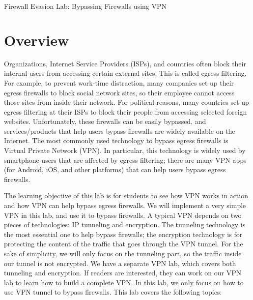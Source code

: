 



\newcommand{\firewallFigs}{./Figs}





\begin{center}
{\LARGE Firewall Evasion Lab: Bypassing Firewalls using VPN}
\end{center}



\setcounter{task}{1}
\newcommand{\tasks} {\bf {\noindent (\arabic{task})} \addtocounter{task}{1} \,}


\section{Overview}


Organizations, Internet Service Providers (ISPs), and countries often block
their internal users from accessing certain external sites. This is called
egress filtering. 
For example, to prevent work-time distraction, many companies set up their egress firewalls
to block social network sites, so their employee cannot access those sites
from inside their network. For political reasons, many countries set up egress filtering at their
ISPs to block their people from accessing
selected foreign websites. Unfortunately, these firewalls can be easily
bypassed, and services/products that help users bypass firewalls are widely
available on the Internet. The most commonly used technology to bypass
egress firewalls is Virtual Private Network (VPN).
In particular, this technology is widely used by smartphone users that are affected by
egress filtering; there are many VPN apps (for Android, iOS, and other
platforms) that can help users bypass egress firewalls. 


The learning objective of this lab is for students to see 
how VPN works in action and how VPN can help bypass egress firewalls.     
We will implement a very simple VPN in this lab, and use it to bypass
firewalls. A typical VPN depends on two pieces of technologies: IP tunneling
and encryption. The tunneling technology is the most essential one to help
bypass firewalls; the encryption technology is for protecting the content
of the traffic that goes through the VPN tunnel. 
For the sake of simplicity, we will only focus on the tunneling part,
so the traffic inside our tunnel is not encrypted. We have a separate
VPN lab, which covers both tunneling and encryption. If readers are
interested, they can work on our VPN lab to learn how to build a complete
VPN. In this lab, we only focus on how to use VPN tunnel to bypass firewalls.
This lab covers the following topics:

